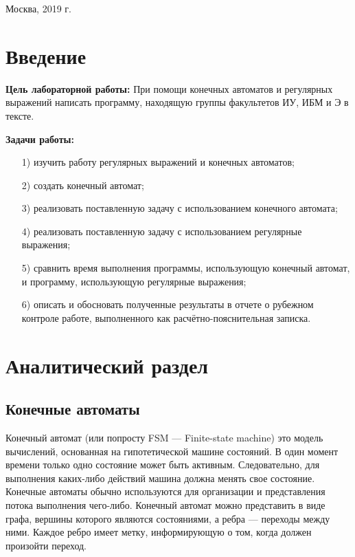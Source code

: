 \documentclass[a4paper,12pt]{article}
\begin{document}
\vspace*{40mm}
\begin{center}
	Москва, 2019 г.  
\end{center}
\thispagestyle{empty}

\tableofcontents

\section*{Введение}

\textbf{Цель лабораторной работы:} При помощи конечных автоматов и регулярных выражений написать программу, находящую группы факультетов ИУ, ИБМ и Э в тексте.

\textbf{Задачи работы:}

\begin{enumerate} 
	\item[1)] изучить работу регулярных выражений и конечных автоматов;
	\item[2)] создать конечный автомат;
	\item[3)] реализовать поставленную задачу с использованием конечного автомата;
	\item[4)] реализовать поставленную задачу с использованием регулярные выражения;
	\item[5)] сравнить время выполнения программы, использующую конечный автомат, и программу, использующую регулярные выражения;
	\item[6)] описать и обосновать полученные результаты в отчете о рубежном контроле 
	работе, выполненного как расчётно-пояснительная записка. 
\end{enumerate} 
\pagebreak

\section{Аналитический раздел}

\subsection{Конечные автоматы}

Конечный автомат (или попросту FSM — Finite-state machine) это модель вычислений, основанная на гипотетической машине состояний. В один момент времени только одно состояние может быть активным. Следовательно, для выполнения каких-либо действий машина должна менять свое состояние.
Конечные автоматы обычно используются для организации и представления потока выполнения чего-либо.
Конечный автомат можно представить в виде графа, вершины которого являются состояниями, а ребра — переходы между ними. Каждое ребро имеет метку, информирующую о том, когда должен произойти переход.
\end{document}
